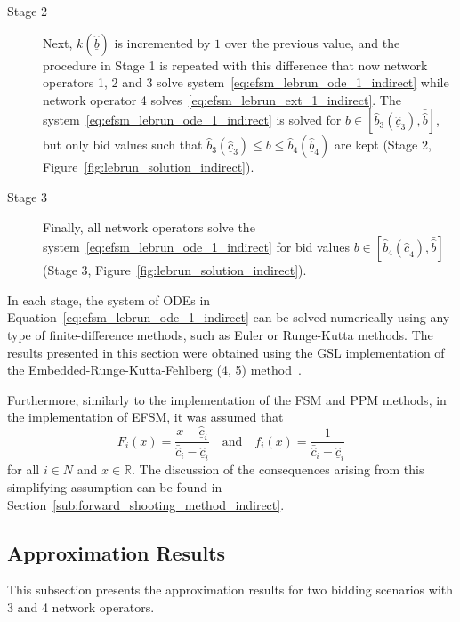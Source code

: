\begin{description}
\item[Stage 2] Next, $k(\underline{\hat{b}})$ is incremented by $1$ over the previous value, and the procedure in Stage 1 is repeated with this difference that now network operators 1, 2 and 3 solve system~\eqref{eq:efsm_lebrun_ode_1_indirect} while network operator 4 solves~\eqref{eq:efsm_lebrun_ext_1_indirect}. The system~\eqref{eq:efsm_lebrun_ode_1_indirect} is solved for $b\in [\hat{b}_3(\underline{\hat{c}}_3), \bar{\hat{b}}]$, but only bid values such that $\hat{b}_3(\underline{\hat{c}}_3)\leq b\leq \hat{b}_4(\underline{\hat{b}}_4)$ are kept (Stage 2, Figure~\ref{fig:lebrun_solution_indirect}).

\item[Stage 3] Finally, all network operators solve the system~\eqref{eq:efsm_lebrun_ode_1_indirect} for bid values $b\in [\hat{b}_4(\underline{\hat{c}}_4),\bar{\hat{b}}]$ (Stage 3, Figure~\ref{fig:lebrun_solution_indirect}).
\end{description}

In each stage, the system of ODEs in Equation~\eqref{eq:efsm_lebrun_ode_1_indirect} can be solved numerically using any type of finite-difference methods, such as Euler or Runge-Kutta methods. The results presented in this section were obtained using the GSL implementation of the Embedded-Runge-Kutta-Fehlberg (4, 5) method~\cite{GSL}.

Furthermore, similarly to the implementation of the FSM and PPM methods, in the implementation of EFSM, it was assumed that
\begin{equation}
  F_i(x) = \frac{x - \underline{\hat{c}}_i}{\bar{\hat{c}}_i - \underline{\hat{c}}_i} \quad\textrm{and}\quad f_i(x) = \frac{1}{\bar{\hat{c}}_i - \underline{\hat{c}}_i}
\end{equation}
for all $i\in N$ and $x\in\mathbb{R}$. The discussion of the consequences arising from this simplifying assumption can be found in Section~\ref{sub:forward_shooting_method_indirect}.


\subsection{Approximation Results} %
\label{sub:extended_approximation_results_indirect}
This subsection presents the approximation results for two bidding scenarios with 3 and 4 network operators. 


